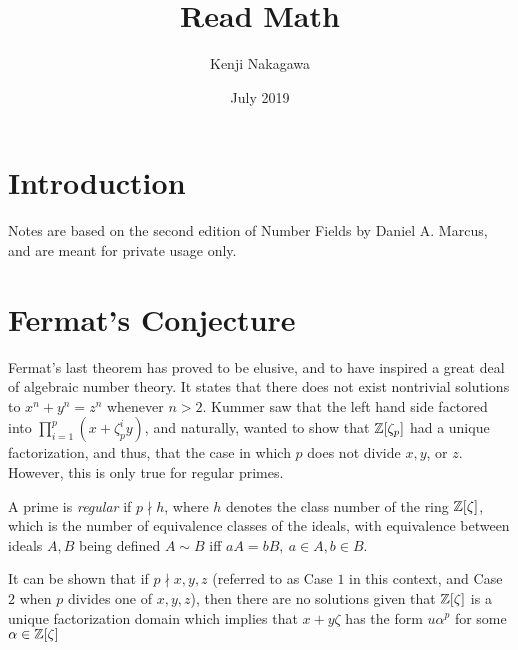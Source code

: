 \documentclass{article}
\title{Read Math}
\author{Kenji Nakagawa}
\date{July 2019}
\begin{document}
\maketitle

\section*{Introduction}
Notes are based on the second edition of Number Fields by Daniel A. Marcus, and are meant for private usage only.


\section{Fermat's Conjecture}
Fermat's last theorem has proved to be elusive, and to have inspired a great deal of algebraic number theory. It states that there does not exist nontrivial solutions to \(x^n+y^n=z^n \) whenever \(n > 2\). Kummer saw that the left hand side factored into \(\prod\limits_{i=1}^p (x+\zeta_p^iy)\), and naturally, wanted to show that \(\mathbb Z[\zeta_p] \) had a unique factorization, and thus, that the case in which \( p\) does not divide \(x,y\), or \(z\). However, this is only true for regular primes.
\begin{definition}
A prime is \textit{regular} if \(p \nmid h \), where \(h\) denotes the class number of the ring \(\mathbb Z[\zeta]\), which is the number of equivalence classes of the ideals, with equivalence between ideals \(A,B\) being defined \(A \sim B\) iff \(aA=bB, \ a \in A, b \in B\).
\end{definition}

It can be shown that if \(p \nmid x,y,z\) (referred to as Case \(1\) in this context, and Case \(2\) when \(p\) divides one of \(x,y,z\)), then there are no solutions given that \(\mathbb Z[\zeta]\) is a unique factorization domain which implies that \(x+y\zeta \) has the form \(u\alpha^p\) for some \( \alpha \in \mathbb Z[\zeta]\)
\end{document}
